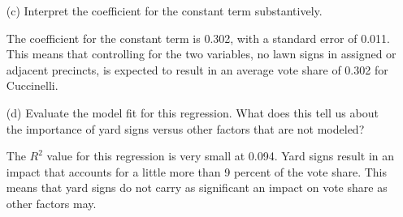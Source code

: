 \documentclass[12pt,letterpaper]{article}
\begin{document}
\begin{enumerate}
Hypothesis:
\begin{center}
	Null: lawn signs in adjacent precincts do not impact Cuccinelli's vote share $$H_0: \beta = 0$$
	
	Alternate: lawn signs in adjacent precincts have an impact on Cuccinelli's vote share $$H_A: \beta \neq 0$$
\end{center}

Test-Statistic:
$$test-stat = \beta / se$$
\begin{center}
	3.231  = 0.042 / 0.013
\end{center}
 {PS04_answersAR.R}

P-Value:
 {PS04_answersAR.R}

Conclusion:
Reject the null hypothesis as 0.00157 is less than 0.05; a one-unit increase in lawn signs in adjacent precincts does impact Cuccinelli's vote share according to this regression.
\newpage
	\item [(c)] Interpret the coefficient for the constant term substantively.

The coefficient for the constant term is 0.302, with a standard error of 0.011.
This means that controlling for the two variables, no lawn signs in assigned or adjacent precincts, is expected to result in an average vote share of 0.302 for Cuccinelli.

	
	\item [(d)] Evaluate the model fit for this regression.  What does this	tell us about the importance of yard signs versus other factors that are not modeled?

The $R^2$ value for this regression is very small at 0.094. Yard signs result in an impact that accounts for a little more than 9 percent of the vote share. This means that yard signs do not carry as significant an impact on vote share as other factors may.


\end{enumerate}  
\end{document}
